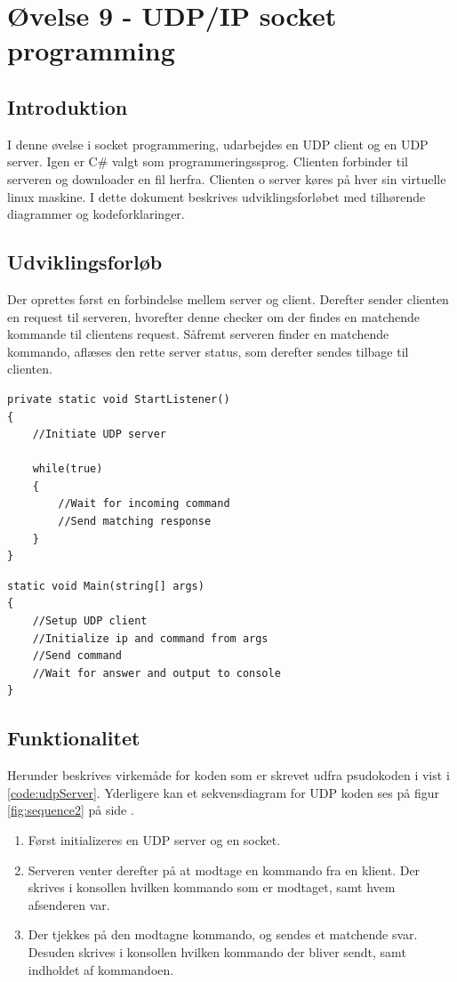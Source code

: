 \section{Øvelse 9 - UDP/IP socket programming}

\subsection{Introduktion}
I denne øvelse i socket programmering, udarbejdes en UDP client og en UDP server. Igen er C\# valgt som programmeringssprog. Clienten forbinder til serveren og downloader en fil herfra. Clienten o server køres på hver sin virtuelle linux maskine. I dette dokument beskrives udviklingsforløbet med tilhørende diagrammer og kodeforklaringer.

\subsection{Udviklingsforløb}
Der oprettes først en forbindelse mellem server og client. Derefter sender clienten en request til serveren, hvorefter denne checker om der findes en matchende kommande til clientens request.
Såfremt serveren finder en matchende kommando, aflæses den rette server status, som derefter sendes tilbage til clienten.

\begin{lstlisting}[caption = Hoveddesign for server,label=code:udpServer]
private static void StartListener() 
{
	//Initiate UDP server
	
	while(true) 
	{
		//Wait for incoming command
		//Send matching response
	}
}
\end{lstlisting}

\begin{lstlisting}[caption = Hoveddesign for client,label=code:udpClient]
static void Main(string[] args)
{
	//Setup UDP client
	//Initialize ip and command from args
	//Send command
	//Wait for answer and output to console
}
\end{lstlisting}

\subsection{Funktionalitet}
Herunder beskrives virkemåde for koden som er skrevet udfra psudokoden i vist i \ref{code:udpServer}. Yderligere kan et sekvensdiagram for UDP koden ses på figur \ref{fig:sequence2} på side \pageref{fig:sequence2}.

\begin{enumerate}
	\item Først initializeres en UDP server og en socket.
	\item Serveren venter derefter på at modtage en kommando fra en klient. Der skrives i konsollen hvilken
	kommando som er modtaget, samt hvem afsenderen var.
	\item Der tjekkes på den modtagne kommando, og sendes et matchende svar. Desuden skrives i konsollen
	hvilken kommando der bliver sendt, samt indholdet af kommandoen.
\end{enumerate}

